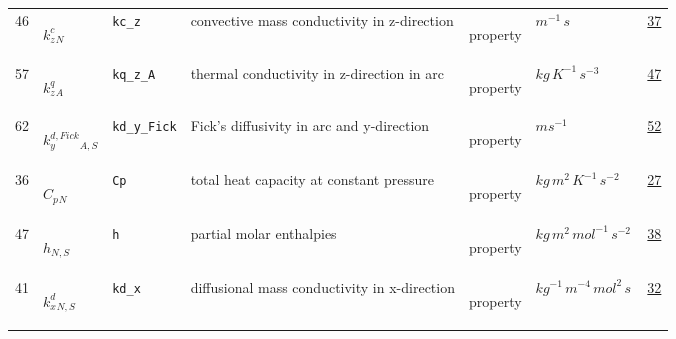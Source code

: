 \begin{longtable}{|p{1cm}|p{2.5cm}|p{4.5cm}|p{8cm}|p{3.0cm}|p{3cm}|p{1cm}|}
                 \\
            46
             & \hypertarget{"v:46"}{ $ {{k^c_z}}{_{N}} $}
             & \verb|kc_z|
             &  convective mass conductivity in z-direction
             & \begin{lay}property \end{lay}
             & $ m^{-1} \,s \, $
             &                 \hyperlink{"e:37"}{ 37 }
                 \\
            57
             & \hypertarget{"v:57"}{ $ {{k^q_z}}{_{A}} $}
             & \verb|kq_z_A|
             & thermal conductivity in z-direction in arc
             & \begin{lay}property \end{lay}
             & $ kg \,K^{-1} \,s^{-3} \, $
             &                 \hyperlink{"e:47"}{ 47 }
                 \\
            62
             & \hypertarget{"v:62"}{ $ {{k^{d,Fick}_y}}{_{A, S}} $}
             & \verb|kd_y_Fick|
             & Fick's diffusivity in arc and y-direction 
             & \begin{lay}property \end{lay}
             & $ m s^{-1} \, $
             &                 \hyperlink{"e:52"}{ 52 }
                 \\
            36
             & \hypertarget{"v:36"}{ $ {{C_p}}{_{N}} $}
             & \verb|Cp|
             & total heat capacity at constant pressure
             & \begin{lay}property \end{lay}
             & $ kg \,m^{2} \,K^{-1} \,s^{-2} \, $
             &                 \hyperlink{"e:27"}{ 27 }
                 \\
            47
             & \hypertarget{"v:47"}{ $ {h}{_{N, S}} $}
             & \verb|h|
             & partial molar enthalpies
             & \begin{lay}property \end{lay}
             & $ kg \,m^{2} \,mol^{-1} \,s^{-2} \, $
             &                 \hyperlink{"e:38"}{ 38 }
                 \\
            41
             & \hypertarget{"v:41"}{ $ {{k^d_x}}{_{N, S}} $}
             & \verb|kd_x|
             & diffusional mass conductivity in x-direction
             & \begin{lay}property \end{lay}
             & $ kg^{-1} \,m^{-4} \,mol^{2} \,s \, $
             &                 \hyperlink{"e:32"}{ 32 }

\end{longtable}
